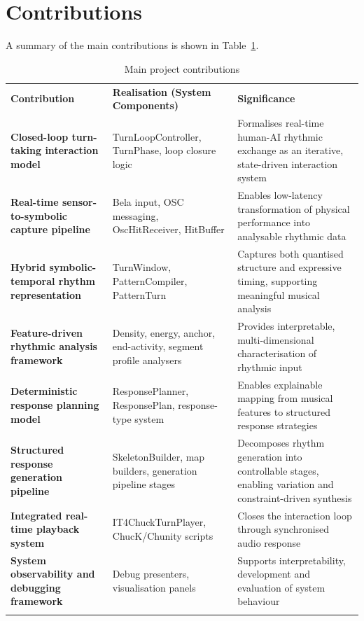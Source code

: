 \section{Contributions}\label{contributions}

A summary of the main contributions is shown in Table~\ref{tab:contributions-summary}.

\begin{longtable}[]{@{}lll@{}}
\caption{Main project contributions}\label{tab:contributions-summary}\\
\toprule\noalign{}
\textbf{Contribution} & \textbf{Realisation (System Components)} &
\textbf{Significance} \\
\textbf{Closed-loop turn-taking interaction model} & TurnLoopController,
TurnPhase, loop closure logic & Formalises real-time human-AI rhythmic
exchange as an iterative, state-driven interaction system \\
\textbf{Real-time sensor-to-symbolic capture pipeline} & Bela input, OSC
messaging, OscHitReceiver, HitBuffer & Enables low-latency
transformation of physical performance into analysable rhythmic data \\
\textbf{Hybrid symbolic-temporal rhythm representation} & TurnWindow,
PatternCompiler, PatternTurn & Captures both quantised structure and
expressive timing, supporting meaningful musical analysis \\
\textbf{Feature-driven rhythmic analysis framework} & Density, energy,
anchor, end-activity, segment profile analysers & Provides
interpretable, multi-dimensional characterisation of rhythmic input \\
\textbf{Deterministic response planning model} & ResponsePlanner,
ResponsePlan, response-type system & Enables explainable mapping from
musical features to structured response strategies \\
\textbf{Structured response generation pipeline} & SkeletonBuilder, map
builders, generation pipeline stages & Decomposes rhythm generation into
controllable stages, enabling variation and constraint-driven
synthesis \\
\textbf{Integrated real-time playback system} & IT4ChuckTurnPlayer,
ChucK/Chunity scripts & Closes the interaction loop through synchronised
audio response \\
\textbf{System observability and debugging framework} & Debug
presenters, visualisation panels & Supports interpretability,
development and evaluation of system behaviour \\
\midrule\noalign{}
\endhead
\bottomrule\noalign{}
\endlastfoot
\end{longtable}
